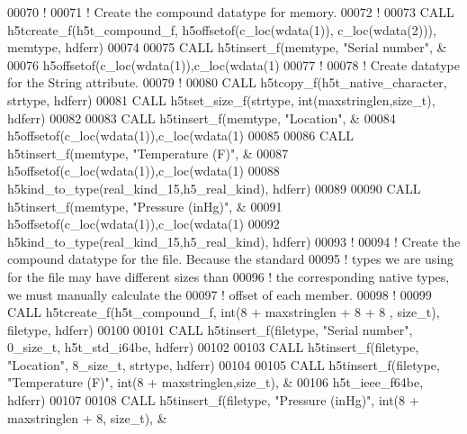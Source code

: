 \begin{DoxyCode}
00070   \textcolor{comment}{!}
00071   \textcolor{comment}{! Create the compound datatype for memory.}
00072   \textcolor{comment}{!}
00073   \textcolor{keyword}{CALL }h5tcreate\_f(h5t\_compound\_f, h5offsetof(c\_loc(wdata(1)), c\_loc(wdata(2))), memtype, hdferr)
00074   
00075   \textcolor{keyword}{CALL }h5tinsert\_f(memtype, \textcolor{stringliteral}{"Serial number"}, &
00076        h5offsetof(c\_loc(wdata(1)),c\_loc(wdata(1)%
00077   \textcolor{comment}{!}
00078   \textcolor{comment}{! Create datatype for the String attribute.}
00079   \textcolor{comment}{!}
00080   \textcolor{keyword}{CALL }h5tcopy\_f(h5t\_native\_character, strtype, hdferr)
00081   \textcolor{keyword}{CALL }h5tset\_size\_f(strtype, int(maxstringlen,size\_t), hdferr)  
00082 
00083   \textcolor{keyword}{CALL }h5tinsert\_f(memtype, \textcolor{stringliteral}{"Location"}, &
00084        h5offsetof(c\_loc(wdata(1)),c\_loc(wdata(1)%
00085 
00086   \textcolor{keyword}{CALL }h5tinsert\_f(memtype, \textcolor{stringliteral}{"Temperature (F)"}, &
00087        h5offsetof(c\_loc(wdata(1)),c\_loc(wdata(1)%
00088        h5kind\_to\_type(real\_kind\_15,h5\_real\_kind), hdferr)
00089 
00090   \textcolor{keyword}{CALL }h5tinsert\_f(memtype, \textcolor{stringliteral}{"Pressure (inHg)"}, &
00091        h5offsetof(c\_loc(wdata(1)),c\_loc(wdata(1)%
00092        h5kind\_to\_type(real\_kind\_15,h5\_real\_kind), hdferr)
00093   \textcolor{comment}{!}
00094   \textcolor{comment}{! Create the compound datatype for the file.  Because the standard}
00095   \textcolor{comment}{! types we are using for the file may have different sizes than}
00096   \textcolor{comment}{! the corresponding native types, we must manually calculate the}
00097   \textcolor{comment}{! offset of each member.}
00098   \textcolor{comment}{!}
00099   \textcolor{keyword}{CALL }h5tcreate\_f(h5t\_compound\_f, int(8 + maxstringlen + 8 + 8 , size\_t), filetype, hdferr)
00100   
00101   \textcolor{keyword}{CALL }h5tinsert\_f(filetype, \textcolor{stringliteral}{"Serial number"}, 0\_size\_t, h5t\_std\_i64be, hdferr)
00102 
00103   \textcolor{keyword}{CALL }h5tinsert\_f(filetype, \textcolor{stringliteral}{"Location"}, 8\_size\_t, strtype, hdferr)
00104 
00105   \textcolor{keyword}{CALL }h5tinsert\_f(filetype, \textcolor{stringliteral}{"Temperature (F)"}, int(8 + maxstringlen,size\_t), &
00106        h5t\_ieee\_f64be, hdferr)
00107 
00108   \textcolor{keyword}{CALL }h5tinsert\_f(filetype, \textcolor{stringliteral}{"Pressure (inHg)"}, int(8 + maxstringlen + 8, size\_t), &

\end{DoxyCode}
